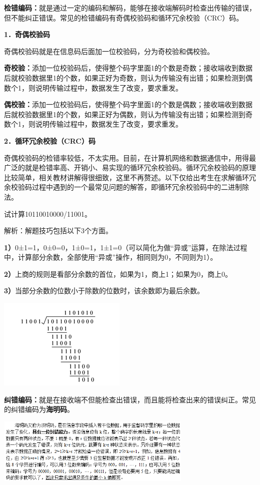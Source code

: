 {\textbf{检错编码：}}就是通过一定的编码和解码，能够在接收端解码时检查出传输的错误，但不能纠正错误。常见的检错编码有奇偶校验码和循环冗余校验（CRC）码。

\textbf{1．奇偶校验码}

奇偶校验码就是在信息码后面加一位校验码，分为奇校验和偶校验。

\textbf{奇校验：}添加一位校验码后，使得整个码字里面1的个数是奇数；接收端收到数据后就校验数据里1的个数，如果正好为奇数，则认为传输没有出错；如果检测到偶数个1，则说明传输过程中，数据发生了改变，要求重发。

\textbf{偶校验：}添加一位校验码后，使得整个码字里面1的个数是偶数；接收端收到数据后就校验数据里1的个数，如果正好为偶数，则认为传输没有出错；如果检测到奇数个1，则说明传输过程中，数据发生了改变，要求重发。

\textbf{2．循环冗余校验（CRC）码}

奇偶校验码的检错率较低，不太实用。目前，在计算机网络和数据通信中，用得最广泛的就是检错率高、开销小、易实现的循环冗余校验码。循环冗余校验码的原理比较简单，相关教材讲解得很细致，这里不再赘述。以下仅给出考生在求解循环冗余校验码过程中遇到的一个最常见问题的解答，即循环冗余校验码中的二进制除法。

试计算10110010000/11001。

解析：解题技巧包括以下3个方面。

\textbf{1）}0±1=1，0±0=0，1±0=1，1±1=0（可以简化为做``异或''运算，在除法过程中，计算部分余数，全部使用``异或''操作，相同则为0，不同则为1）。

\textbf{2）}上商的规则是看部分余数的首位，如果为1，商上1；如果为0，商上0。

\textbf{3）}当部分余数的位数小于除数的位数时，该余数即为最后余数。

\includegraphics[width=2.40625in,height=1.71875in]{png-jpeg-pics/82DEB1BAC5D556F013E4B41211927DD0.png}

{\textbf{纠错编码：}}就是在接收端不但能检查出错误，而且能将检查出来的错误纠正。常见的纠错编码为\textbf{海明码}。

\includegraphics[width=3.69792in,height=1.23958in]{png-jpeg-pics/1871FE8447BD32C51FF14CE58A2608EA.png}
